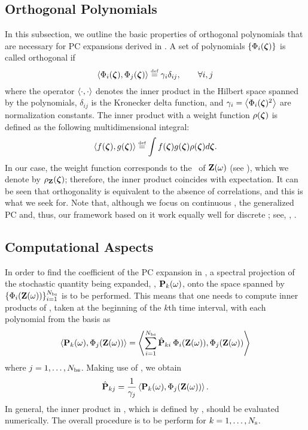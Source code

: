 \subsection{Orthogonal Polynomials} 
In this subsection, we outline the basic properties of orthogonal polynomials that are necessary for PC expansions derived in . A set of polynomials $\{ \Phi_i(\boldsymbol{\zeta}) \}$ is called orthogonal if
\begin{equation} \elabel{orthogonality}
  \oInner{\pcb_i(\vz)}{\pcb_j(\vz)} \eqdef \pcn_i \delta_{ij}, \qquad \forall i, j
\end{equation}
where the operator $\oInner{\idot}{\idot}$ denotes the inner product in the Hilbert space spanned by the polynomials, $\delta_{ij}$ is the Kronecker delta function, and $\pcn_i = \oInner{\pcb_i(\vz)^2}$ are normalization constants. The inner product with a weight function $\rho(\boldsymbol{\zeta})$ is defined as the following multidimensional integral:
\begin{equation} \elabel{inner-product}
  \oInner{f(\vz)}{g(\vz)} \eqdef \int f(\vz) g(\vz) \PDF(\vz) d\vz.
\end{equation}
In our case, the weight function corresponds to the \pdf\ of $\mathbf{Z}(\omega)$ (see ), which we denote by $\rho_{\mathbf{Z}}(\boldsymbol{\zeta})$; therefore, the inner product coincides with expectation. It can be seen that orthogonality is equivalent to the absence of correlations, and this is what we seek for. Note that, although we focus on continuous \rvs, the generalized PC and, thus, our framework based on it work equally well for discrete \rvs; see, \eg, \cite{xiu2010, maitre2010, xiu2002}.

\subsection{Computational Aspects} 
In order to find the coefficient of the PC expansion in , a spectral projection of the stochastic quantity being expanded, \ie, $\mathbf{P}_k(\omega)$, onto the space spanned by $\{ \Phi_i(\mathbf{Z}(\omega)) \}_{i = 1}^{{N_\text{bs}}}$ is to be performed. This means that one needs to compute inner products of , taken at the beginning of the $k$th time interval, with each polynomial from the basis as
\[
  \oInner{\vP_k(\o)}{\pcb_j(\vZ(\o))} = \oInner{\sum_{i=1}^{\pcterms} \pcc{\vP}_{ki} \: \pcb_i(\vZ(\o))}{\pcb_j(\vZ(\o))}
\]
where $j = 1, \dotsc, {N_\text{bs}}$. Making use of , we obtain
\begin{equation} \elabel{pc-coefficients}
  \pcc{\vP}_{kj} = \frac{1}{\pcn_j} \oInner{\vP_k(\o)}{\pcb_j(\vZ(\o))}.
\end{equation}
In general, the inner product in , which is defined by , should be evaluated numerically. The overall procedure is to be perform for $k = 1, \dotsc, N_\text{s}$.

